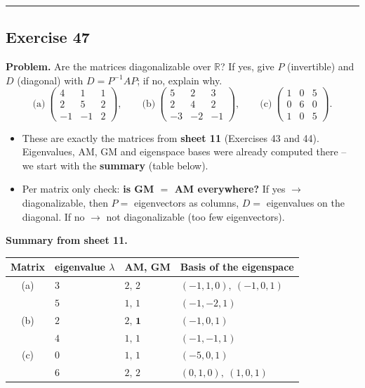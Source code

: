 \documentclass[a4paper,12pt]{article}
\newcommand{\EW}{eigenvalue}
\begin{document}
\bigskip
\hrule
\bigskip

\subsection*{Exercise 47}

\textbf{Problem.} Are the matrices diagonalizable over $\mathbb{R}$? If yes, give $P$ (invertible) and $D$ (diagonal) with $D = P^{-1}AP$; if no, explain why.
\[
\text{(a)}\ \begin{pmatrix} 4 & 1 & 1 \\ 2 & 5 & 2 \\ -1 & -1 & 2 \end{pmatrix}, \qquad
\text{(b)}\ \begin{pmatrix} 5 & 2 & 3 \\ 2 & 4 & 2 \\ -3 & -2 & -1 \end{pmatrix}, \qquad
\text{(c)}\ \begin{pmatrix} 1 & 0 & 5 \\ 0 & 6 & 0 \\ 1 & 0 & 5 \end{pmatrix}.
\]

\begin{wastun}
\begin{itemize}[leftmargin=*, nosep]
    \item These are exactly the matrices from \textbf{sheet 11} (Exercises 43 and 44). Eigenvalues, AM, GM and eigenspace bases were already computed there -- we start with the \textbf{summary} (table below).
    \item Per matrix only check: \textbf{is GM $=$ AM everywhere?} If yes $\to$ diagonalizable, then $P =$ eigenvectors as columns, $D =$ eigenvalues on the diagonal. If no $\to$ not diagonalizable (too few eigenvectors).
\end{itemize}
\end{wastun}

\textbf{Summary from sheet 11.}
\begin{center}
\begin{tabular}{@{}clll@{}}
\toprule
Matrix & \EW{} $\lambda$ & AM, GM & Basis of the eigenspace \\
\midrule
(a) & $3$ & $2,\,2$ & $(-1,1,0),\ (-1,0,1)$ \\
    & $5$ & $1,\,1$ & $(-1,-2,1)$ \\[2pt]
(b) & $2$ & $2,\,\mathbf{1}$ & $(-1,0,1)$ \\
    & $4$ & $1,\,1$ & $(-1,-1,1)$ \\[2pt]
(c) & $0$ & $1,\,1$ & $(-5,0,1)$ \\
    & $6$ & $2,\,2$ & $(0,1,0),\ (1,0,1)$ \\
\bottomrule
\end{tabular}
\end{center}
\end{document}
